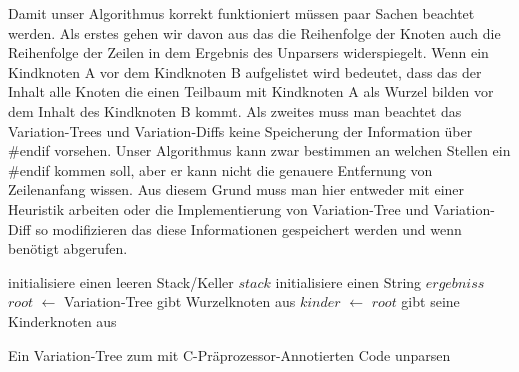 Damit unser Algorithmus korrekt funktioniert müssen paar Sachen beachtet werden. Als erstes gehen wir davon aus das die Reihenfolge der Knoten auch die Reihenfolge der Zeilen in dem Ergebnis des Unparsers widerspiegelt. Wenn ein Kindknoten A vor dem Kindknoten B aufgelistet wird bedeutet, dass das der Inhalt alle Knoten die einen Teilbaum mit Kindknoten A als Wurzel bilden vor dem Inhalt des Kindknoten B kommt. Als zweites muss man beachtet das Variation-Trees und Variation-Diffs keine Speicherung der Information über \#endif vorsehen. Unser Algorithmus kann zwar bestimmen an welchen Stellen ein \#endif kommen soll, aber er kann nicht die genauere Entfernung von Zeilenanfang wissen. Aus diesem Grund muss man hier entweder mit einer Heuristik arbeiten oder die Implementierung von Variation-Tree und Variation-Diff so modifizieren das diese Informationen gespeichert werden und wenn benötigt abgerufen.


\begin{algorithm}[H]
	\SetAlgoLined
	\DontPrintSemicolon
	initialisiere einen leeren Stack/Keller $stack$\;
	initialisiere einen String $ergebniss$
	$root$ $\leftarrow$ Variation-Tree gibt Wurzelknoten aus\;
	$kinder$ $\leftarrow$ $root$ gibt seine Kinderknoten aus\;
	\caption{Ein Variation-Tree zum mit C-Präprozessor-Annotierten Code unparsen}
\end{algorithm}

